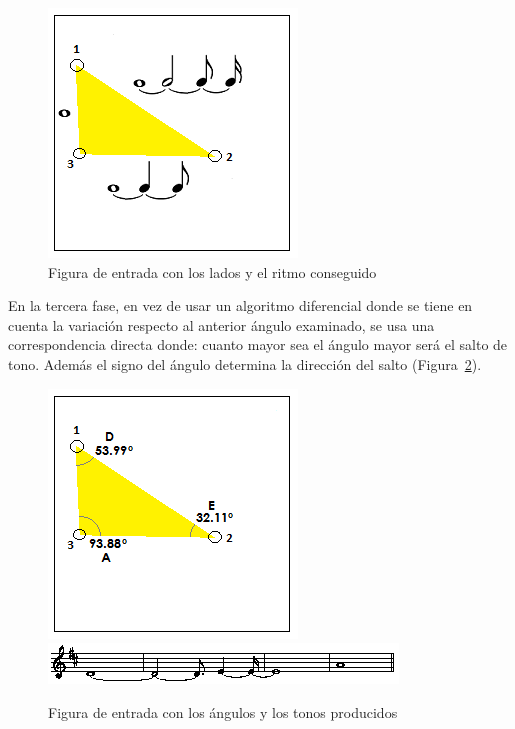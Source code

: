 		\begin{figure}[htbp]
		\centering
		\hspace*{0.0in}
		\includegraphics[scale=1]{graphics/simpletest1-F2_2.png}
		\caption{Figura de entrada con los lados y el ritmo conseguido}
		\label{fig:Figura5Voz1}
		\end{figure}

En la tercera fase, en vez de usar un algoritmo diferencial donde se tiene en cuenta la variación respecto al anterior ángulo examinado, se usa una correspondencia directa donde: cuanto mayor sea el ángulo mayor será el salto de tono. Además el signo del ángulo determina la dirección del salto (Figura~\ref{fig:Figura6Voz1}).

		\begin{figure}[htbp]
		\centering
		\hspace*{0.0in}
		\includegraphics[scale=1]{graphics/simpletest1-F3_2.png}
		\includegraphics[scale=1]{graphics/simpletest1_2-MELpartitura.png}
		\caption{Figura de entrada con los ángulos y los tonos producidos}
		\label{fig:Figura6Voz1}
		\end{figure}

